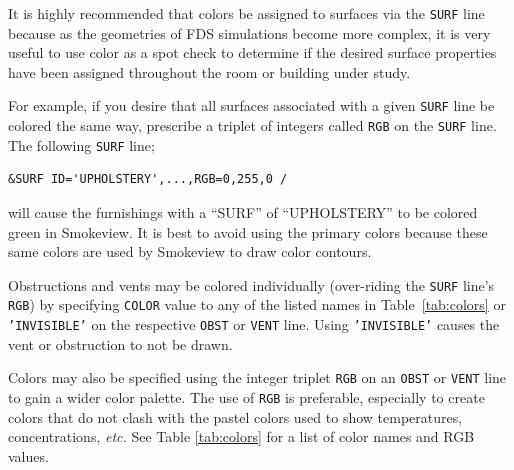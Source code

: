 \documentclass[11pt]{book}
\newcommand{\ct}{\tt\small}
\begin{document}
It is highly recommended that colors be assigned to surfaces via the {\ct SURF} line because as
the geometries of FDS simulations become more complex, it is very useful
to use color as a spot check to determine if the desired
surface properties have been assigned throughout the room or building under study.

For example, if you desire that all surfaces associated with a
given {\ct SURF} line be colored the same way, prescribe a triplet of
integers called {\ct RGB} on the {\ct SURF} line. The following {\ct SURF} line;
\footnotesize
\begin{verbatim}
&SURF ID='UPHOLSTERY',...,RGB=0,255,0 /
\end{verbatim}
\normalsize
will cause the furnishings with a ``SURF'' of ``UPHOLSTERY'' to be colored green in Smokeview.
It is best to avoid using the primary colors because these same colors are
used by Smokeview to draw color contours.

Obstructions and vents may be colored individually (over-riding the
{\ct SURF} line's {\ct RGB}) by specifying {\ct COLOR} value to any of
the listed names in Table~\ref{tab:colors} or {\ct 'INVISIBLE'} on
the respective {\ct OBST} or {\ct VENT} line. Using {\ct 'INVISIBLE'}
causes the vent or obstruction to not be drawn.

Colors may also be specified using the integer triplet {\ct RGB} on an {\ct OBST} or {\ct VENT} line to gain
a wider color palette. The use of {\ct RGB} is preferable, especially
to create colors that do not clash with the pastel colors used to
show temperatures, concentrations, {\em etc.} See Table \ref{tab:colors}
for a list of color names and RGB values.
\end{document}
